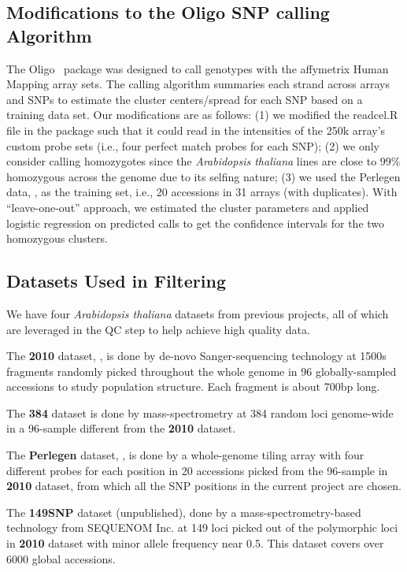 \documentclass[a4paper,10pt]{article}
\begin{document}
\subsection{Modifications to the Oligo SNP calling Algorithm}
\label{Oligo_calling}
The Oligo~\cite{Carvalho2007} package was designed to call genotypes with the affymetrix Human Mapping array sets. The calling algorithm summaries each strand across arrays and SNPs to estimate the cluster centers/spread for each SNP based on a training data set. Our modifications are as follows: (1) we modified the readcel.R file in the package such that it could read in the intensities of the 250k array's custom probe sets (i.e., four perfect match probes for each SNP); (2) we only consider calling homozygotes since the \textit{Arabidopsis thaliana} lines are close to 99\% homozygous across the genome due to its selfing nature; (3) we used the Perlegen data, \cite{Clark2007a}, as the training set, i.e., 20 accessions in 31 arrays (with duplicates). With “leave-one-out” approach, we estimated the cluster parameters and applied logistic regression on predicted calls to get the confidence intervals for the two homozygous clusters.


\subsection{Datasets Used in Filtering}
We have four \textit{Arabidopsis thaliana} datasets from previous projects, all of which are leveraged in the QC step to help achieve high quality data.

The \textbf{2010} dataset, \cite{Nordborg2005}, is done by de-novo Sanger-sequencing technology at 1500s fragments randomly picked throughout the whole genome in 96 globally-sampled accessions to study population structure. Each fragment is about 700bp long.

The \textbf{384} dataset is done by mass-spectrometry at 384 random loci genome-wide in a 96-sample different from the \textbf{2010} dataset.

The \textbf{Perlegen} dataset, \cite{Clark2007a}, is done by a whole-genome tiling array with four different probes for each position in 20 accessions picked from the 96-sample in \textbf{2010} dataset, from which all the SNP positions in the current project are chosen.


The \textbf{149SNP} dataset (unpublished), done by a mass-spectrometry-based technology from SEQUENOM Inc. at 149 loci picked out of the polymorphic loci in \textbf{2010} dataset with minor allele frequency near 0.5. This dataset covers over 6000 global accessions.
\end{document}
